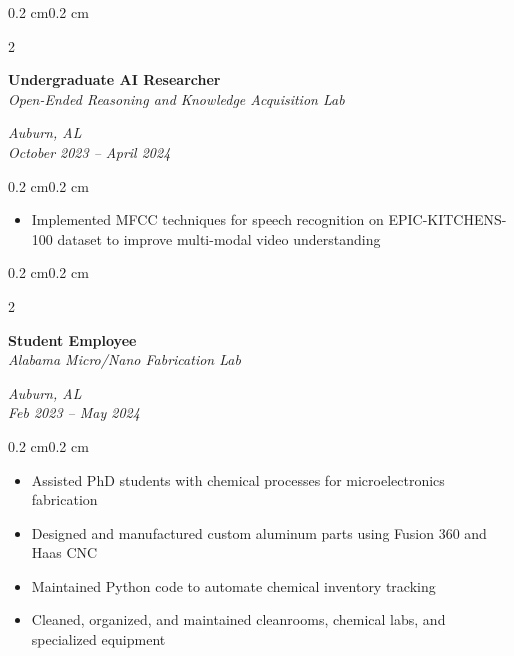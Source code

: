 \documentclass[10pt, letterpaper]{article}
\newenvironment{highlights}{
    \begin{itemize}[topsep=0.10 cm,parsep=0.10 cm,partopsep=0pt,itemsep=0pt,leftmargin=0.4 cm + 10pt]
}{
    \end{itemize}
}
\newenvironment{onecolentry}{
    \begin{adjustwidth}{0.2 cm}{0.2 cm}
}{
    \end{adjustwidth}
}
\newenvironment{twocolentry}[2][]{
    \onecolentry
    \def\secondColumn{#2}
    \setcolumnwidth{\fill, 4.5 cm}
    \begin{paracol}{2}
}{
    \switchcolumn \raggedleft \secondColumn
    \end{paracol}
    \endonecolentry
}
\begin{document}
        \vspace{0.2 cm}

        \begin{twocolentry}{\textit{Auburn, AL} \\ \textit{October 2023 – April 2024}}
            \textbf{Undergraduate AI Researcher} \\
            \textit{Open-Ended Reasoning and Knowledge Acquisition Lab}
        \end{twocolentry}
        \vspace{0.10 cm}
        \begin{onecolentry}
            \begin{highlights}
                \item Implemented MFCC techniques for speech recognition on EPIC-KITCHENS-100 dataset to improve multi-modal video understanding
            \end{highlights}
        \end{onecolentry}

        \vspace{0.2 cm}

        \begin{twocolentry}{\textit{Auburn, AL} \\ \textit{Feb 2023 – May 2024}}
            \textbf{Student Employee} \\
            \textit{Alabama Micro/Nano Fabrication Lab}
        \end{twocolentry}
        \vspace{0.10 cm}
        \begin{onecolentry}
            \begin{highlights}
                \item Assisted PhD students with chemical processes for microelectronics fabrication
                \item Designed and manufactured custom aluminum parts using Fusion 360 and Haas CNC
                \item Maintained Python code to automate chemical inventory tracking
                \item Cleaned, organized, and maintained cleanrooms, chemical labs, and specialized equipment
            \end{highlights}
        \end{onecolentry}

        \vspace{0.2 cm}
\end{document}
